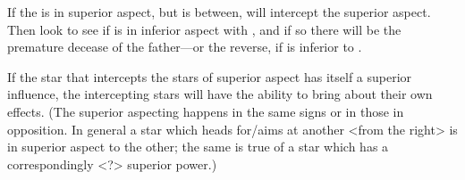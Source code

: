 If the \Sun\xspace is in superior aspect, but \Venus\xspace is between, \Venus\xspace will intercept the superior aspect.  Then look to see if \Saturn\xspace is in inferior aspect with \Venus, and if so there will be the premature decease of the father—or the reverse, if \Venus\xspace is inferior to \Saturn. 

If  the star that intercepts the stars of superior aspect has itself a superior influence, the intercepting stars will have the ability to bring about their own effects. (The superior aspecting happens in the same signs or in those in opposition. In general a star which heads for/aims at another <from the right> is in superior aspect to the other; the same is true of a star which has a correspondingly <?> superior power.)

\newpage
